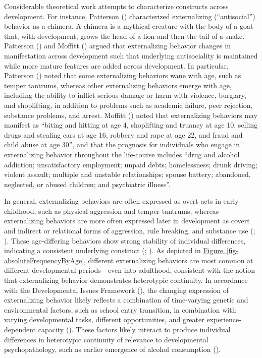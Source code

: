 \documentclass[
  american,
  letterpaper,
  12pt]{article}
\begin{document}
Considerable theoretical work attempts to characterize constructs across
development. For instance, Patterson
() characterized externalizing
(``antisocial'') behavior as a chimera. A chimera is a mythical creature
with the body of a goat that, with development, grows the head of a lion
and then the tail of a snake. Patterson
() and Moffitt
() argued that externalizing behavior
changes in manifestation across development such that underlying
antisociality is maintained while more mature features are added across
development. In particular, Patterson
() noted that some externalizing
behaviors wane with age, such as temper tantrums, whereas other
externalizing behaviors emerge with age, including the ability to
inflict serious damage or harm with violence, burglary, and shoplifting,
in addition to problems such as academic failure, peer rejection,
substance problems, and arrest. Moffitt
() noted that externalizing
behaviors may manifest as ``biting and hitting at age 4, shoplifting and
truancy at age 10, selling drugs and stealing cars at age 16, robbery
and rape at age 22, and fraud and child abuse at age 30'', and that the
prognosis for individuals who engage in externalizing behavior
throughout the life-course includes ``drug and alcohol addiction;
unsatisfactory employment; unpaid debts; homelessness; drunk driving;
violent assault; multiple and unstable relationships; spouse battery;
abandoned, neglected, or abused children; and psychiatric illness''.

In general, externalizing behaviors are often expressed as overt acts in
early childhood, such as physical aggression and temper tantrums;
whereas externalizing behaviors are more often expressed later in
development as covert and indirect or relational forms of aggression,
rule breaking, and substance use (; ). These age-differing behaviors show strong stability of
individual differences, indicating a consistent underlying construct
(;
). As depicted in
\hyperref[fig-absoluteFrequencyByAge]{Figure~\ref*{fig-absoluteFrequencyByAge}},
different externalizing behaviors are most common at different
developmental periods---even into adulthood, consistent with the notion
that externalizing behavior demonstrates heterotypic continuity. In
accordance with the Developmental Issues Framework
(), the changing expression of
externalizing behavior likely reflects a combination of time-varying
genetic and environmental factors, such as school entry transition, in
combination with varying developmental tasks, different opportunities,
and greater experience-dependent capacity
(). These factors
likely interact to produce individual differences in heterotypic
continuity of relevance to developmental psychopathology, such as
earlier emergence of alcohol consumption ().
\end{document}
